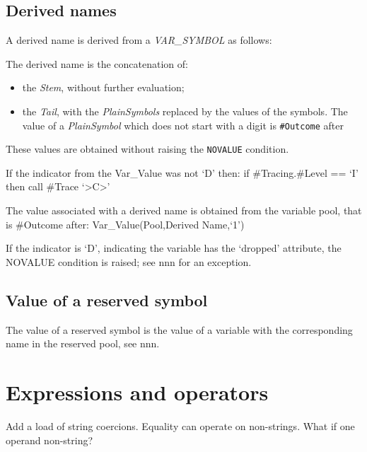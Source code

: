\subsection{Derived names}\label{derived-names}

A derived name is derived from a \emph{VAR\_SYMBOL} as follows:



The derived name is the concatenation of:

\begin{itemize}
\tightlist
\item
  the \emph{Stem}, without further evaluation;
\item
  the \emph{Tail}, with the \emph{PlainSymbols} replaced by the values
  of the symbols. The value of a \emph{PlainSymbol} which does not start
  with a digit is \texttt{\#Outcome} after
\end{itemize}



These values are obtained without raising the \texttt{NOVALUE}
condition.

If the indicator from the Var\_Value was not `D' then: if
\#Tracing.\#Level == `I' then call \#Trace
`\textgreater C\textgreater{}'

The value associated with a derived name is obtained from the variable
pool, that is \#Outcome after: Var\_Value(Pool,Derived Name,`1')

If the indicator is `D', indicating the variable has the `dropped'
attribute, the NOVALUE condition is raised; see nnn for an exception.

\subsection{Value of a reserved
symbol}\label{value-of-a-reserved-symbol}

The value of a reserved symbol is the value of a variable with the
corresponding name in the reserved pool, see nnn.

\section{Expressions and operators}\label{expressions-and-operators}

Add a load of string coercions. Equality can operate on non-strings.
What if one operand non-string?

